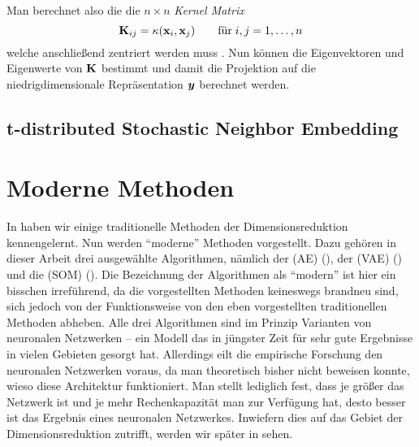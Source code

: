 Man berechnet also die die $n \times n$ \textit{Kernel Matrix}
\begin{equation}
	\mathbf{K}_{ij} = \kappa(\mathbf{x}_i, \mathbf{x}_j) \qquad \text{für}\; i,j = 1,\ldots,n
\end{equation}
welche anschließend zentriert werden muss \parencite[598]{Bishop.2006}. Nun können die Eigenvektoren und Eigenwerte von $\mathbf{K}$ bestimmt und
damit die Projektion auf die niedrigdimensionale Repräsentation $\bm{y}$ berechnet
werden.

\subsection{t-distributed Stochastic Neighbor Embedding}
\label{ch:MethodenDerDimRed:traditionell:t-SNE}

\newpage

\section{Moderne Methoden}
\label{ch:MethodenDerDimRed:modern}
In  haben wir einige traditionelle Methoden der
Dimensionsreduktion kennengelernt. Nun werden \enquote{moderne} Methoden vorgestellt. Dazu gehören
in dieser Arbeit drei ausgewählte Algorithmen, nämlich der  (AE)
(), der  (VAE)
() und die  (SOM)
(). Die Bezeichnung der Algorithmen als \enquote{modern}
ist hier ein bisschen irreführend, da die vorgestellten Methoden keineswegs brandneu sind, sich
jedoch von der Funktionsweise von den eben vorgestellten traditionellen Methoden abheben. Alle drei
Algorithmen sind im Prinzip Varianten von neuronalen Netzwerken -- ein Modell das in jüngster Zeit
für sehr gute Ergebnisse in vielen Gebieten gesorgt hat. Allerdings eilt die empirische Forschung
den neuronalen Netzwerken voraus, da man theoretisch bisher nicht beweisen konnte, wieso diese
Architektur funktioniert. Man stellt lediglich fest, dass je größer das Netzwerk ist und je mehr
Rechenkapazität man zur Verfügung hat, desto besser ist das Ergebnis eines neuronalen
Netzwerkes\addref. Inwiefern dies auf das Gebiet der Dimensionsreduktion zutrifft, werden wir
später in  sehen.

